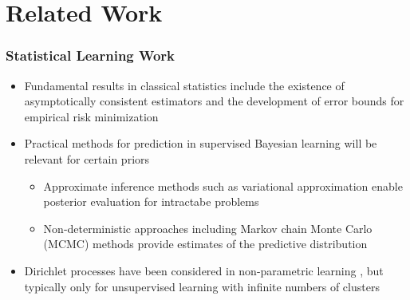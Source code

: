 \documentclass[aspectratio=169,usenames,dvipsnames]{beamer}
\begin{document}
\section{Related Work}


\begin{frame}
\frametitle{Statistical Learning Work}

\begin{itemize}
\item Fundamental results in classical statistics include the existence of asymptotically consistent estimators \cite{stone} and the development of error bounds for empirical risk minimization \cite{vapnik}
\vspace{0.5em}
\item Practical methods for prediction in supervised Bayesian learning will be relevant for certain priors
	\vspace{0.25em}
	\begin{itemize}
	\item Approximate inference methods such as variational approximation \cite{beal} enable posterior evaluation for intractabe problems
	\vspace{0.25em}
	\item Non-deterministic approaches including Markov chain Monte Carlo (MCMC) methods \cite{hastings} provide estimates of the predictive distribution
	\end{itemize}
\vspace{0.5em}
\item Dirichlet processes have been considered in non-parametric learning \cite{ferguson}, but typically only for unsupervised learning with infinite numbers of clusters \cite{gershman}
\end{itemize}

\end{frame}
\end{document}
